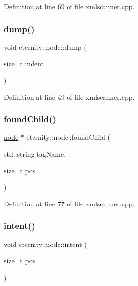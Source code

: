 Definition at line 69 of file xmlscanner.\+cpp.

\mbox{\label{classeternity_1_1node_a05e3159af39079b860ecb1f79d436bb1}} 
\subsubsection{\texorpdfstring{dump()}{dump()}}
{\footnotesize\ttfamily void eternity\+::node\+::dump (\begin{DoxyParamCaption}\item[{size\+\_\+t}]{indent }\end{DoxyParamCaption})}



Definition at line 49 of file xmlscanner.\+cpp.

\mbox{\label{classeternity_1_1node_a17c2bb4c6bb9594076e91935bd970224}} 
\subsubsection{\texorpdfstring{found\+Child()}{foundChild()}}
{\footnotesize\ttfamily \hyperlink{classeternity_1_1node}{node} $\ast$ eternity\+::node\+::found\+Child (\begin{DoxyParamCaption}\item[{std\+::string}]{tag\+Name,  }\item[{size\+\_\+t}]{pos }\end{DoxyParamCaption})}



Definition at line 77 of file xmlscanner.\+cpp.

\mbox{\label{classeternity_1_1node_a35b42655fbf388f225c108f10bf46028}} 
\subsubsection{\texorpdfstring{intent()}{intent()}}
{\footnotesize\ttfamily void eternity\+::node\+::intent (\begin{DoxyParamCaption}\item[{size\+\_\+t}]{pos }\end{DoxyParamCaption})}



